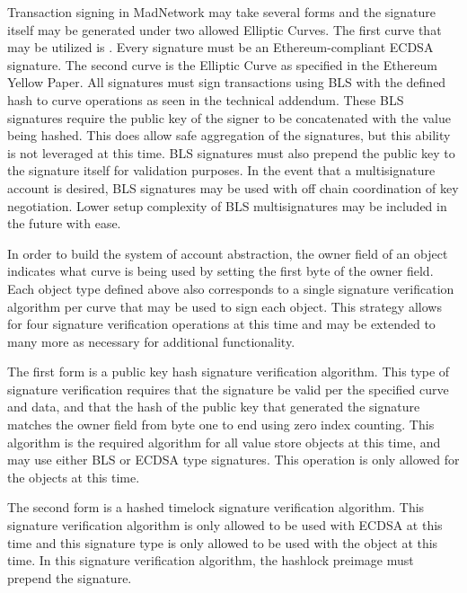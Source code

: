 Transaction signing in MadNetwork may take several forms and the
signature itself may be generated under two allowed Elliptic Curves.
The first curve that may be utilized is \secp{}.
Every \secp{} signature must be an Ethereum-compliant ECDSA signature.
The second curve is the \bnEth{} Elliptic Curve as specified in the
Ethereum Yellow Paper.
All \bnEth{} signatures must sign transactions using BLS with the defined
hash to curve operations as seen in the technical addendum.
These BLS signatures require the public key of the signer to be
concatenated with the value being hashed.
This does allow safe aggregation of the signatures, but this ability is
not leveraged at this time.
BLS signatures must also prepend the public key to the signature itself
for validation purposes.
In the event that a multisignature account is desired, BLS signatures
may be used with off chain coordination of key negotiation.
Lower setup complexity of BLS multisignatures may be included in the
future with ease.

In order to build the system of account abstraction, the owner field of
an object indicates what curve is being used by setting the first byte
of the owner field.
Each object type defined above also corresponds to a single signature
verification algorithm per curve that may be used to sign each object.
This strategy allows for four signature verification operations at this
time and may be extended to many more as necessary for additional
functionality.

The first form is a public key hash signature verification algorithm.
This type of signature verification requires that the signature be
valid per the specified curve and data, and that the hash of the public
key that generated the signature matches the owner field from byte one
to end using zero index counting.
This algorithm is the required algorithm for all value store objects at
this time, and may use either BLS or ECDSA type signatures.
This operation is only allowed for the \ValueStore{} objects at this time.

The second form is a hashed timelock signature verification algorithm.
This signature verification algorithm is only allowed to be used with
ECDSA at this time and this signature type is only allowed to be used
with the \AtomicSwap{} object at this time.
In this signature verification algorithm, the hashlock preimage must
prepend the signature.

